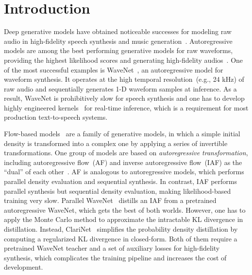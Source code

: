 \documentclass{article}
\begin{document}
\section{Introduction}
Deep generative models have obtained noticeable successes for modeling raw audio in high-fidelity speech synthesis and music generation~\citep[e.g.,][]{oord2016wavenet, dieleman2018challenge}. 
Autoregressive models are among the best performing generative models for raw waveforms, providing the highest likelihood scores and generating high-fidelity audios~\citep{oord2016wavenet,mehri2016samplernn, kalchbrenner2018efficient}. 
One of the most successful examples is WaveNet~\citep{oord2016wavenet}, an autoregressive model for waveform synthesis.
It operates at the high temporal resolution~(e.g., 24 kHz) of raw audio and sequentially generates 1-D waveform samples at inference. 
As a result, WaveNet is prohibitively slow for speech synthesis and one has to develop highly engineered kernels~\citep{arik2017DV1, nv-wavenet18} for real-time inference, which is a requirement for most production text-to-speech systems.


Flow-based models~\citep{dinh2014nice, rezende2015variational} are a family of generative models, in which a simple initial density is transformed into a complex one by applying a series of invertible transformations.
One group of models are based on \emph{autoregressive transformation}, including {autoregressive flow}~(AF) and {inverse autoregressive flow}~(IAF) as the ``dual'' of each other~\citep{kingma2016improved, papamakarios2017masked, huang2018neural}.
AF is analogous to autoregressive models, which performs parallel density evaluation and sequential synthesis. 
In contrast, IAF performs parallel synthesis but sequential density evaluation, making likelihood-based training very slow.
Parallel WaveNet~\citep{oord2017parallel} distills an IAF from a pretrained autoregressive WaveNet, which gets the best of both worlds. 
However, one has to apply the Monte Carlo method to approximate the intractable KL divergence in distillation.
Instead, ClariNet~\citep{ping2018clarinet} simplifies the probability density distillation by computing a regularized KL divergence in closed-form.
Both of them require a pretrained WaveNet teacher and a set of auxiliary losses for high-fidelity synthesis, which complicates the training pipeline and increases the cost of development.
\end{document}
